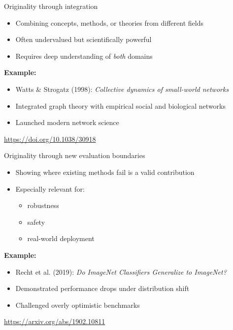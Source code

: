 \documentclass[aspectratio=169]{beamer}
\begin{document}
\begin{frame}{Originality through integration}
  \begin{itemize}
    \item Combining concepts, methods, or theories from different fields
    \item Often undervalued but scientifically powerful
    \item Requires deep understanding of \emph{both} domains
  \end{itemize}

  \vspace{0.5em}
  \textbf{Example:}
  \begin{itemize}
    \item Watts \& Strogatz (1998): \emph{Collective dynamics of small-world networks}
    \item Integrated graph theory with empirical social and biological networks
    \item Launched modern network science
  \end{itemize}

  \vspace{0.3em}
  \tiny
  \url{https://doi.org/10.1038/30918}
\end{frame}

\begin{frame}{Originality through new evaluation boundaries}
  \begin{itemize}
    \item Showing where existing methods fail is a valid contribution
    \item Especially relevant for:
      \begin{itemize}
        \item robustness
        \item safety
        \item real-world deployment
      \end{itemize}
  \end{itemize}

  \vspace{0.5em}
  \textbf{Example:}
  \begin{itemize}
    \item Recht et al. (2019): \emph{Do ImageNet Classifiers Generalize to ImageNet?}
    \item Demonstrated performance drops under distribution shift
    \item Challenged overly optimistic benchmarks
  \end{itemize}

  \vspace{0.3em}
  \tiny
  \url{https://arxiv.org/abs/1902.10811}
\end{frame}
\end{document}
